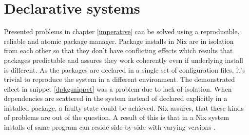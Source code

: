 



\section{Declarative systems} \label{declarativesystems}

Presented problems in chapter \ref{imperative} can be solved using a
reproducible, reliable and atomic package manager. Package
installs in Nix are in isolation from each other so that they don't
have conflicting effects which results that packages predictable and
assures they work coherently even if underlying install is
different. As the packages are declared in a single set of
configuration files, it's trivial to reproduce the system in a
different environment. The demonstrated effect in snippet
\ref{dpkgsnippet} was a problem due to lack of isolation. When
dependencies are scattered in the system instead of declared
explicitly in a installed package, a faulty state could be
achieved. Nix assures, that these kinds of problems are out of the
question. A result of this is that in a Nix system installs of same
program can reside side-by-side with varying versions
\cite{dolstra2008nixos}.

